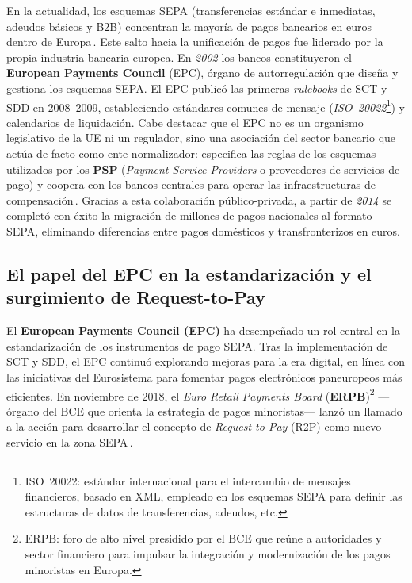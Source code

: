 En la actualidad, los esquemas SEPA (transferencias estándar e inmediatas, adeudos básicos y B2B) concentran la mayoría de pagos bancarios en euros dentro de Europa\,\cite{Numeral2022}. Este salto hacia la unificación de pagos fue liderado por la propia industria bancaria europea. En \textit{2002} los bancos constituyeron el \textbf{European Payments Council} (EPC), órgano de autorregulación que diseña y gestiona los esquemas SEPA. El EPC publicó las primeras \emph{rulebooks} de SCT y SDD en 2008–2009, estableciendo estándares comunes de mensaje (\emph{ISO~20022}\footnote{ISO~20022: estándar internacional para el intercambio de mensajes financieros, basado en XML, empleado en los esquemas SEPA para definir las estructuras de datos de transferencias, adeudos, etc.}) y calendarios de liquidación. Cabe destacar que el EPC no es un organismo legislativo de la UE ni un regulador, sino una asociación del sector bancario que actúa de facto como ente normalizador: especifica las reglas de los esquemas utilizados por los \textbf{PSP} (\emph{Payment Service Providers} o proveedores de servicios de pago) y coopera con los bancos centrales para operar las infraestructuras de compensación\,\cite{Numeral2022}. Gracias a esta colaboración público-privada, a partir de \textit{2014} se completó con éxito la migración de millones de pagos nacionales al formato SEPA, eliminando diferencias entre pagos domésticos y transfronterizos en euros.

\subsection{El papel del EPC en la estandarización y el surgimiento de Request-to-Pay}
\label{subsec:epc-rtp}

El \textbf{European Payments Council (EPC)} ha desempeñado un rol central en la estandarización de los instrumentos de pago SEPA. Tras la implementación de SCT y SDD, el EPC continuó explorando mejoras para la era digital, en línea con las iniciativas del Eurosistema para fomentar pagos electrónicos paneuropeos más eficientes. En noviembre de 2018, el \emph{Euro Retail Payments Board} (\textbf{ERPB})\footnote{ERPB: foro de alto nivel presidido por el BCE que reúne a autoridades y sector financiero para impulsar la integración y modernización de los pagos minoristas en Europa.} —órgano del BCE que orienta la estrategia de pagos minoristas— lanzó un llamado a la acción para desarrollar el concepto de \emph{Request to Pay} (R2P) como nuevo servicio en la zona SEPA\,\cite{EBACLEARING2020}.  

